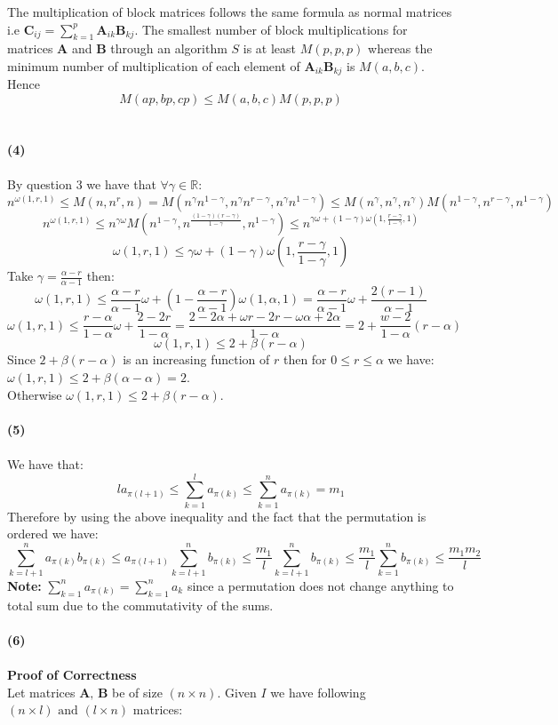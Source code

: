\documentclass[10pt,a4paper]{article}
\begin{document}
The multiplication of block matrices follows the same formula as normal matrices i.e $\mathbf{C}_{ij}=\sum ^p _{k=1} \mathbf{A}_{ik}\mathbf{B}_{kj}$. The smallest number of block multiplications for matrices $\mathbf{A}$ and $\mathbf{B}$ through an algorithm $S$ is at least $M(p,p,p)$ whereas the minimum number of multiplication of each element of $\mathbf{A}_{ik}\mathbf{B}_{kj}$ is $M(a,b,c)$.  Hence $$M(ap,bp,cp) \leq M(a,b,c)M(p,p,p)$$\\\\
\textbf{(4)}
\\\\ By question 3 we have that $\forall \gamma \in \mathbb{R}$:
$$n^{\omega(1,r,1)} \leq M(n, n^r, n) = M(n^{\gamma}n^{1-\gamma},n^{\gamma}n^{r-\gamma}, n^{\gamma}n^{1-\gamma}) \leq M(n^{\gamma}, n^{\gamma}, n^{\gamma})M(n^{1-\gamma}, n^{r-\gamma},n^{1-\gamma})$$ 
$$
n^{\omega(1,r,1)} \leq n^{\gamma \omega} M(n^{1-\gamma},n^{\frac{(1-\gamma)(r-\gamma)}{1-\gamma}}, n^{1-\gamma})\leq n^{\gamma \omega+(1-\gamma) \omega(1,\frac{r-\gamma}{1-\gamma},1)}
$$
$$
\omega(1,r,1) \leq {\gamma \omega+(1-\gamma) \omega(1,\frac{r-\gamma}{1-\gamma},1)}
$$
Take $\gamma = \frac{\alpha - r}{\alpha -1}$ then:
$$
\omega(1,r,1) \leq {\frac{\alpha - r}{\alpha -1} \omega+(1-\frac{\alpha - r}{\alpha -1}) \omega(1,\alpha,1)} = \frac{\alpha - r}{\alpha -1} \omega+\frac{2(r-1)}{\alpha -1} 
$$
$$\omega(1,r,1) \leq \frac{r - \alpha}{1-\alpha} \omega+\frac{2 - 2r}{ 1-\alpha} = \frac{2 - 2\alpha+\omega r - 2r -\omega\alpha + 2\alpha}{1-\alpha} = 2 + \frac{w-2}{1-\alpha}(r-\alpha)$$ $$\omega(1,r,1) \leq 2 + \beta(r-\alpha) $$
Since $2 + \beta(r-\alpha)$ is an increasing function of $r$ then for $0 \leq r \leq \alpha$ we have:
$\omega(1,r,1) \leq 2 + \beta(\alpha-\alpha) = 2$.\\
Otherwise $\omega(1,r,1) \leq 2 + \beta(r-\alpha) $.\\\\
\textbf{(5)}\\\\
We have that:
$$la_{\pi(l+1)} \leq \sum _{k=1}^l a_{\pi(k)} \leq \sum _{k=1}^n a_{\pi(k)} = m_1 $$
Therefore by using the above inequality and the fact that the permutation is ordered we have:
$$\sum _{k=l+1}^n a_{\pi(k)} b_{\pi(k)} \leq a_{\pi(l+1)} \sum _{k=l+1}^n b_{\pi(k)} \leq \frac{m_1}{l} \sum _{k=l+1}^n b_{\pi(k)} \leq 
\frac{m_1}{l} \sum _{k=1}^n b_{\pi(k)}
\leq \frac{m_1m_2}{l}$$
\textbf{Note:} $\sum _{k=1} ^ n a_{\pi(k)} = \sum _{k=1}^n a_k$ since a permutation does not change anything to total sum due to the commutativity of the sums.\\\\
\textbf{(6)}\\\\
\textbf{Proof of Correctness}\\
Let matrices $\mathbf{A , \, B}$ be of size $(n \times n)$. Given $I $ we have following $(n\times l) \text{ and } (l \times n)$ matrices:
\end{document}
